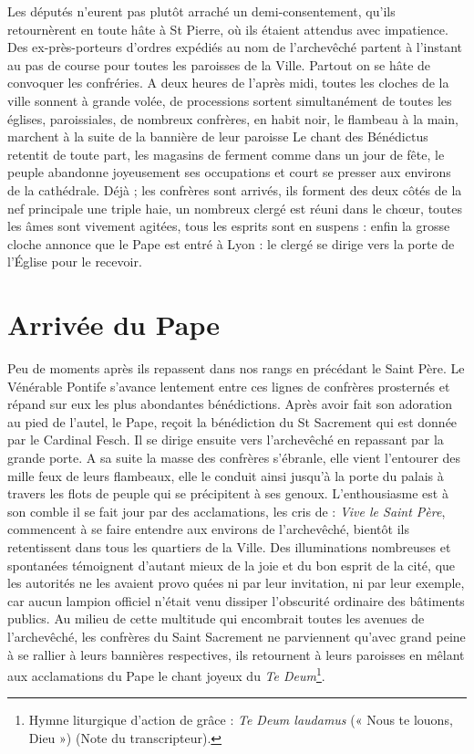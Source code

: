 \documentclass[11pt,a4paper]{report}
\begin{document}
Les députés n'eurent pas plutôt arraché un demi-consentement, qu'ils retournèrent en toute hâte à St Pierre, où ils étaient attendus avec impatience. Des ex-près-porteurs d'ordres expédiés au nom de l'archevêché partent à l'instant au pas de course pour toutes les paroisses de la Ville. Partout on se hâte de convoquer les confréries. A deux heures de l'après midi, toutes les cloches de la ville sonnent à grande volée, de processions sortent simultanément de toutes les églises, paroissiales, de nombreux confrères, en habit noir, le flambeau à la main, marchent à la suite de la bannière de leur paroisse Le chant des Bénédictus retentit de toute part, les magasins de ferment comme dans un jour de fête, le peuple abandonne joyeusement ses occupations et court se presser aux environs de la cathédrale. Déjà ; les confrères sont arrivés, ils forment des deux côtés de la nef principale une triple haie, un nombreux clergé est réuni dans le chœur, toutes les âmes sont vivement agitées, tous les esprits sont en suspens : enfin la grosse cloche annonce que le Pape est entré à Lyon : le clergé se dirige vers la porte de l'Église pour le recevoir.

\section*{Arrivée du Pape}

Peu de moments après ils repassent dans nos rangs en précédant le Saint Père. Le Vénérable Pontife s'avance lentement entre ces lignes de confrères prosternés et répand sur eux les plus abondantes bénédictions. Après avoir fait son adoration au pied de l'autel, le Pape, reçoit la bénédiction du St Sacrement qui est donnée par le Cardinal Fesch. Il se dirige ensuite vers l'archevêché en repassant par la grande porte. A sa suite la masse des confrères s'ébranle, elle vient l'entourer des mille feux de leurs flambeaux, elle le conduit ainsi jusqu'à la porte du palais à travers les flots de peuple qui se précipitent à ses genoux. L'enthousiasme est à son comble il se fait jour par des acclamations, les cris de : \textit{Vive le Saint Père}, commencent à se faire entendre aux environs de l'archevêché, bientôt ils retentissent dans tous les quartiers de la Ville. Des illuminations nombreuses et spontanées témoignent d'autant mieux de la joie et du bon esprit de la cité, que les autorités ne les avaient provo quées ni par leur invitation, ni par leur exemple, car aucun lampion officiel n'était venu dissiper l'obscurité ordinaire des bâtiments publics. Au milieu de cette multitude qui encombrait toutes les avenues de l'archevêché, les confrères du Saint Sacrement ne parviennent qu'avec grand peine à se rallier à leurs bannières respectives, ils retournent à leurs paroisses en mêlant aux acclamations du Pape le chant joyeux du \textit{Te Deum}\footnote{Hymne liturgique d'action de grâce : \textit{Te Deum laudamus} (« Nous te louons, Dieu ») (Note du transcripteur).}.
\end{document}
